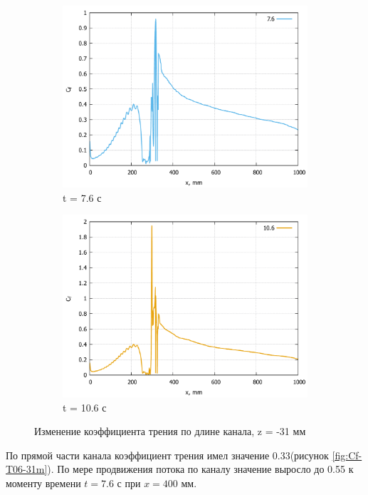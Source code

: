 \begin{figure}[H]
		\\
		\begin{subfigure}{.5\textwidth}
			\centering
			\includegraphics[width=1\linewidth]{../Assets/Cf-T760-31m}
			\caption{t = 7.6 с}
			\label{fig:Cf-T760-31m}
		\end{subfigure}%
		\begin{subfigure}{.5\textwidth}
			\centering
			\includegraphics[width=1\linewidth]{../Assets/Cf-T1060-31m}
			\caption{t = 10.6 с}
			\label{fig:Cf-T1060-31m}
		\end{subfigure}
		\caption{Изменение коэффициента трения по длине канала, z = -31 мм}
		\label{fig:cf-31m}
	\end{figure}
	По прямой части канала коэффициент трения имел значение 0.33(рисунок \ref{fig:Cf-T06-31m}). По мере продвижения потока по каналу значение выросло до 0.55 к моменту времени $t = 7.6$ с при $x = 400$ мм.
	
